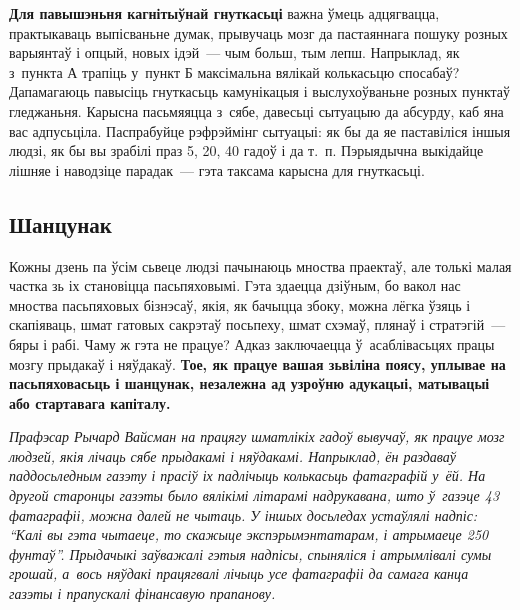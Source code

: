\textbf{Для павышэньня кагнітыўнай гнуткасьці} важна ўмець адцягвацца, практыкаваць выпісваньне думак, прывучаць мозг да пастаяннага пошуку розных варыянтаў і опцый, новых ідэй~--- чым больш, тым лепш. Напрыклад, як з~пункта А трапіць у~пункт Б максімальна вялікай колькасьцю спосабаў? Дапамагаюць павысіць гнуткасьць камунікацыя і выслухоўваньне розных пунктаў гледжаньня. Карысна пасьмяяцца з~сябе, давесьці сытуацыю да абсурду, каб яна вас адпусьціла. Паспрабуйце рэфрэймінг сытуацыі: як бы да яе паставіліся іншыя людзі, як бы вы зрабілі праз 5, 20, 40 гадоў і да т.~п. Пэрыядычна выкідайце лішняе і наводзіце парадак~--- гэта таксама карысна для гнуткасьці. 


\subsection*{Шанцунак}

Кожны дзень па ўсім сьвеце людзі пачынаюць мноства праектаў, але толькі малая частка зь іх становіцца пасьпяховымі. Гэта здаецца дзіўным, бо вакол нас мноства пасьпяховых бізнэсаў, якія, як бачыцца збоку, можна лёгка ўзяць і скапіяваць, шмат гатовых сакрэтаў посьпеху, шмат схэмаў, плянаў і стратэгій~--- бяры і рабі. Чаму ж гэта не працуе? Адказ заключаецца ў~асаблівасьцях працы мозгу прыдакаў і няўдакаў. \textbf{Тое, як працуе вашая зьвіліна поясу, уплывае на пасьпяховасьць і шанцунак, незалежна ад узроўню адукацыі, матывацыі або стартавага капіталу.}

\emph{Прафэсар Рычард Вайсман на працягу шматлікіх гадоў вывучаў, як працуе мозг людзей, якія лічаць сябе прыдакамі і няўдакамі. Напрыклад, ён раздаваў паддосьледным газэту і прасіў іх падлічыць колькасьць фатаграфій у~ёй. На другой старонцы газэты было вялікімі літарамі надрукавана, што ў~газэце 43 фатаграфіі, можна далей не чытаць. У іншых досьледах устаўлялі надпіс: ``Калі вы гэта чытаеце, то скажыце экспэрымэнтатарам, і атрымаеце 250 фунтаў''. Прыдачыкі заўважалі гэтыя надпісы, спыняліся і атрымлівалі сумы грошай, а~вось няўдакі працягвалі лічыць усе фатаграфіі да самага канца газэты і прапускалі фінансавую прапанову.}

